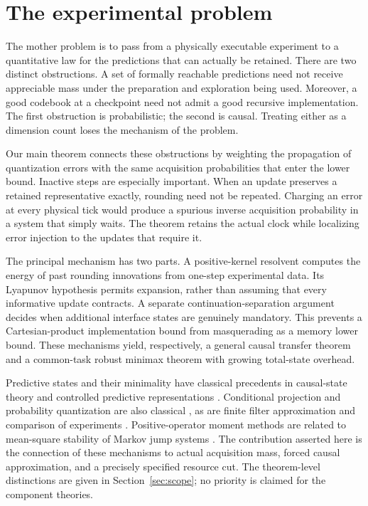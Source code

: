 \section{The experimental problem}\label{sec:experiment}
The mother problem is to pass from a physically executable experiment to a quantitative law for the predictions that can actually be retained. There are two distinct obstructions. A set of formally reachable predictions need not receive appreciable mass under the preparation and exploration being used. Moreover, a good codebook at a checkpoint need not admit a good recursive implementation. The first obstruction is probabilistic; the second is causal. Treating either as a dimension count loses the mechanism of the problem.

Our main theorem connects these obstructions by weighting the propagation of quantization errors with the same acquisition probabilities that enter the lower bound. Inactive steps are especially important. When an update preserves a retained representative exactly, rounding need not be repeated. Charging an error at every physical tick would produce a spurious inverse acquisition probability in a system that simply waits. The theorem retains the actual clock while localizing error injection to the updates that require it.

The principal mechanism has two parts. A positive-kernel resolvent computes the energy of past rounding innovations from one-step experimental data. Its Lyapunov hypothesis permits expansion, rather than assuming that every informative update contracts. A separate continuation-separation argument decides when additional interface states are genuinely mandatory. This prevents a Cartesian-product implementation bound from masquerading as a memory lower bound. These mechanisms yield, respectively, a general causal transfer theorem and a common-task robust minimax theorem with growing total-state overhead.

Predictive states and their minimality have classical precedents in causal-state theory and controlled predictive representations \cite{shalizi,psr}. Conditional projection and probability quantization are also classical \cite{graf}, as are finite filter approximation \cite{pages,sellami,feuer} and comparison of experiments \cite{blackwell,lecam,torgersen}. Positive-operator moment methods are related to mean-square stability of Markov jump systems \cite{costa}. The contribution asserted here is the connection of these mechanisms to actual acquisition mass, forced causal approximation, and a precisely specified resource cut. The theorem-level distinctions are given in Section~\ref{sec:scope}; no priority is claimed for the component theories.


